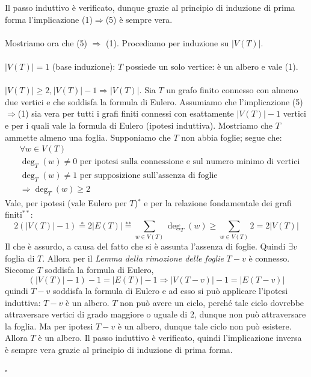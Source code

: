 \documentclass[oneside]{book}
\theoremstyle{remark}
\newcommand{\cvd}{\begin{flushright}$\square$\end{flushright}} %
\begin{document}
\begin{tcolorbox}[
        enhanced,
        breakable,
        title={Teorema di caratterizzazione degli alberi finiti con formula di Eulero}
    ]
    Il passo induttivo è verificato, dunque grazie al principio di induzione di prima forma
    l'implicazione (1)$\Rightarrow$(5) è sempre vera.
    \\\\
    Mostriamo ora che (5) $\Rightarrow$ (1). Procediamo per induzione su $|V(T)|$.
    \\\\
    $|V(T)|=1$ (base induzione): $T$ possiede un solo vertice: è un albero e vale (1).
    \\\\
    $|V(T)|\geq 2, |V(T)|-1\Longrightarrow|V(T)|$. Sia $T$ un grafo finito
    connesso con almeno due vertici e che soddisfa la formula di Eulero. Assumiamo che l'implicazione
    (5)$\Rightarrow$(1) sia vera per tutti i grafi finiti connessi con esattamente
    $|V(T)|-1$ vertici e per i quali vale la formula di Eulero (ipotesi induttiva).
    Mostriamo che $T$ ammette almeno una foglia.
    Supponiamo che $T$ non abbia foglie; segue che:
    \begin{align*}
        &\forall w\in V(T)\\
        &\deg_T(w)\not = 0 \text{ per ipotesi sulla connessione e sul numero minimo di vertici}\\
        &\deg_T(w)\not = 1 \text{ per supposizione sull'assenza di foglie}\\
        &\Longrightarrow \deg_T(w)\geq 2
    \end{align*}
    Vale, per ipotesi (vale Eulero per $T$)$^*$ e per la relazione fondamentale dei grafi finiti$^{**}$:
    \[ 2(|V(T)|-1)\stackrel{\text{*}}{=}2|E(T)|\stackrel{\text{**}}{=}\sum_{w\in V(T)}\deg_T(w)\geq \sum_{w\in V(T)}2=2|V(T)| \]
    Il che è assurdo, a causa del fatto che si è assunta l'assenza di foglie.
    Quindi $\exists v$ foglia di $T$. Allora per il \textit{Lemma della rimozione delle foglie}
    $T-v$ è connesso.
    Siccome $T$ soddisfa la formula di Eulero,
    \[ (|V(T)|-1) -1 = |E(T)|-1 \Rightarrow |V(T-v)|-1=|E(T-v)|\]
    quindi $T-v$ soddisfa la formula di Eulero
    e ad esso si può applicare l'ipotesi induttiva: $T-v$ è un albero. $T$ non
    può avere un ciclo, perché tale ciclo dovrebbe attraversare vertici di grado
    maggiore o uguale di 2, dunque non può attraversare la foglia. Ma per ipotesi
    $T-v$ è un albero, dunque tale ciclo non può esistere. Allora $T$ è un albero.
    Il passo induttivo è verificato, quindi l'implicazione inversa è sempre vera
    grazie al principio di induzione di prima forma.
    \cvd
\end{tcolorbox}
\end{document}

